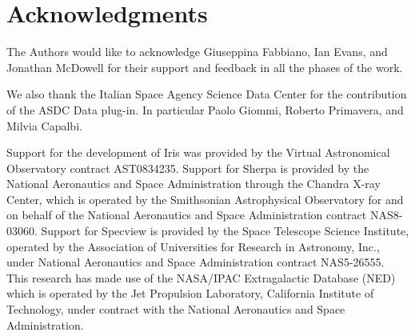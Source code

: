\documentclass[preprint,authoryear,5p]{elsarticle}
\begin{document}
\section*{Acknowledgments}
The Authors would like to acknowledge Giuseppina Fabbiano, Ian Evans,
and Jonathan McDowell
for their support and feedback in all the phases of the work.

We also thank the Italian Space Agency Science Data Center for the contribution
of the ASDC Data plug-in. In particular Paolo Giommi, Roberto Primavera, and
Milvia Capalbi.

Support for the development of Iris was provided by
the Virtual Astronomical Observatory contract AST0834235. Support for Sherpa is
provided by the National Aeronautics and Space Administration through the
Chandra X-ray Center, which is operated by the Smithsonian Astrophysical
Observatory for and on behalf of the National Aeronautics and Space
Administration contract NAS8-03060.  Support for Specview is provided by the
Space Telescope Science Institute, operated by the Association of Universities
for Research in Astronomy, Inc., under National Aeronautics and Space
Administration contract NAS5-26555. This research has made use of the NASA/IPAC
Extragalactic Database (NED) which is operated by the Jet Propulsion Laboratory,
California Institute of Technology, under contract with the National Aeronautics
and Space Administration.
\end{document}
